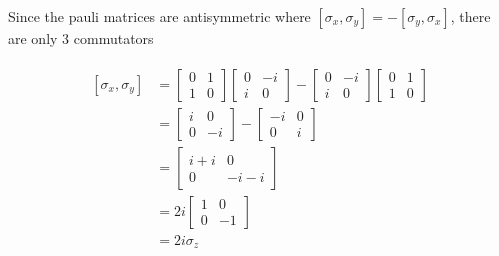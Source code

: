 \documentclass{article}
\begin{document}
\begin{paragraph}
    Since the pauli matrices are antisymmetric where $[\sigma_x, \sigma_y] = -[\sigma_y, \sigma_x]$, there are only 3 commutators
\end{paragraph}

\begin{align*}
    \begin{split}
    [\sigma_x, \sigma_y] &=
    \begin{bmatrix}
        0 & 1 \\
        1 & 0
    \end{bmatrix}
    \begin{bmatrix}
        0 & -i \\
        i & 0
    \end{bmatrix}
    - \begin{bmatrix}
        0 & -i \\
        i & 0
    \end{bmatrix}
    \begin{bmatrix}
        0 & 1 \\
        1 & 0
    \end{bmatrix} \\
    &= 
    \begin{bmatrix}
        i & 0 \\
        0 & -i
    \end{bmatrix}
    - \begin{bmatrix}
        -i & 0 \\
        0 & i
    \end{bmatrix} \\
    &= \begin{bmatrix}
        i + i & 0 \\
        0 & -i - i
    \end{bmatrix} \\
    &= 2i \begin{bmatrix}
        1 & 0 \\
        0 & -1
    \end{bmatrix} \\
    &= 2i\sigma_z \\
    \end{split}
\end{align*}
\end{document}
